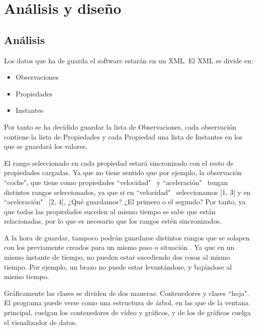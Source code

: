 \chapter{An\'{a}lisis y dise\~{n}o}


\section{An\'{a}lisis}
Los datos que ha de guarda el software estar\'an en un XML. El XML se divide en:
\begin{itemize}
	\item Observaciones
	\item Propiedades
	\item Instantes
\end{itemize}

Por tanto se ha decidido guardar la lista de Observaciones, cada observaci\'on contiene la lista de Propiedades 
y cada Propiedad una lista de Instantes en los que se guardar\'a los valores.

El rango seleccionado en cada propiedad estar\'a sincronizado con el resto de propiedades cargadas. 
Ya que no tiene sentido que por ejemplo, la observaci\'on ``coche", 
que tiene como propiedades ``velocidad" \ y ``aceleraci\'on" \ tengan distintos rangos 
seleccionados, ya que si en ``velocidad" \ seleccionamos [1, 3] y en ``aceleraci\'on" \ [2, 4], 
¿Qu\'e guardamos? ¿El primero o el segundo? Por tanto, ya que todas las propiedades suceden al
mismo tiempo se sabe que est\'an relacionadas, por lo que es necesario que los rangos est\'en
sincronizados.

A la hora de guardar, tampoco podr\'an guardarse distintos rangos que se solapen con los
previamente creados para un mismo paso o situaci\'on
. Ya que en un mismo instante de tiempo, no pueden estar sucediendo dos cosas al mismo tiempo.
Por ejemplo, un brazo no puede estar levant\'andose, y baj\'andose al mismo tiempo.

Gr\'aficamente las clases se dividen de dos maneras: Contenedores y clases ``hoja".
El programa puede verse como una estructura de \'arbol, en las que de la ventana principal,
cuelgan los contenedores de v\'ideo y gr\'aficos, y de los de gr\'aficos cuelga el 
visualizador de datos.

